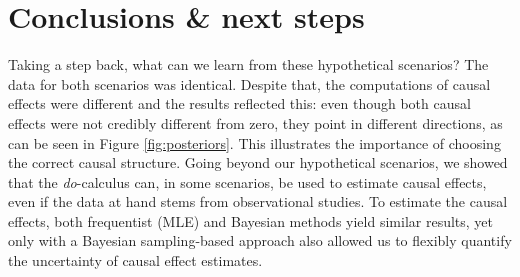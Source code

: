 \documentclass[nobib]{tufte-handout}
\newcommand{\docalc}{\emph{do}-calculus\xspace}
\begin{document}
\section{Conclusions \& next steps}
\label{sec:conclusions--next}

Taking a step back, what can we learn from these hypothetical scenarios?
The data for both scenarios was identical.
Despite that, the computations of causal effects were different and the results reflected this: even though both causal effects were not credibly different from zero, they point in different directions, as can be seen in Figure \ref{fig:posteriors}.
This illustrates the importance of choosing the correct causal structure. 
Going beyond our hypothetical scenarios, we showed that the \docalc can, in some scenarios, be used to estimate causal effects, even if the data at hand stems from observational studies.
To estimate the causal effects, both frequentist (MLE) and Bayesian methods yield similar results, yet only with a Bayesian sampling-based approach also allowed us to flexibly quantify the uncertainty of causal effect estimates.
\end{document}

